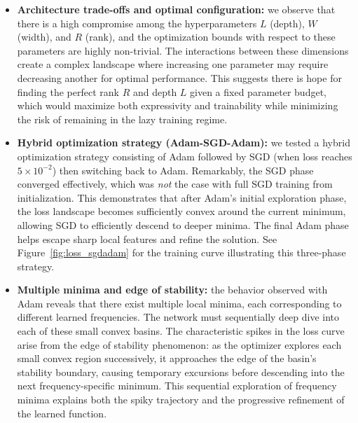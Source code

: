 \documentclass[12pt]{article}
\begin{document}
\begin{itemize}
    \item \textbf{Architecture trade-offs and optimal configuration:} we observe that there is a high compromise among the hyperparameters $L$ (depth), $W$ (width), and $R$ (rank), and the optimization bounds with respect to these parameters are highly non-trivial. The interactions between these dimensions create a complex landscape where increasing one parameter may require decreasing another for optimal performance. This suggests there is hope for finding the perfect rank $R$ and depth $L$ given a fixed parameter budget, which would maximize both expressivity and trainability while minimizing the risk of remaining in the lazy training regime.\\
    
    \item \textbf{Hybrid optimization strategy (Adam-SGD-Adam):} we tested a hybrid optimization strategy consisting of Adam followed by SGD (when loss reaches $5 \times 10^{-2}$) then switching back to Adam. Remarkably, the SGD phase converged effectively, which was \emph{not} the case with full SGD training from initialization. This demonstrates that after Adam's initial exploration phase, the loss landscape becomes sufficiently convex around the current minimum, allowing SGD to efficiently descend to deeper minima. The final Adam phase helps escape sharp local features and refine the solution. See Figure~\ref{fig:loss_sgdadam} for the training curve illustrating this three-phase strategy.\\
    
    \item \textbf{Multiple minima and edge of stability:} the behavior observed with Adam reveals that there exist multiple local minima, each corresponding to different learned frequencies. The network must sequentially deep dive into each of these small convex basins. The characteristic spikes in the loss curve arise from the edge of stability phenomenon: as the optimizer explores each small convex region successively, it approaches the edge of the basin's stability boundary, causing temporary excursions before descending into the next frequency-specific minimum. This sequential exploration of frequency minima explains both the spiky trajectory and the progressive refinement of the learned function.\\
\end{itemize}
\end{document}
